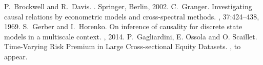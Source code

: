 \documentclass[a0,portrait]{a0poster}
\begin{document}
\begin{multicols}{2}
\par


\begin{thebibliography}{10}
P.~Brockwell and R.~Davis.
.
\newblock Springer, Berlin, 2002.
C.~Granger.
\newblock Investigating causal relations by econometric models and
  cross-spectral methods.
, 37:424--438, 1969.
S.~Gerber and I.~Horenko.
\newblock On inference of causality for discrete state models in a multiscale
  context.
, 2014.
P.~Gagliardini, E. Ossola and O. Scaillet.
\newblock Time-Varying Risk Premium in Large Cross-sectional Equity Datasets.
, to appear.
 

\end{thebibliography}

\end{multicols}
\end{document}
